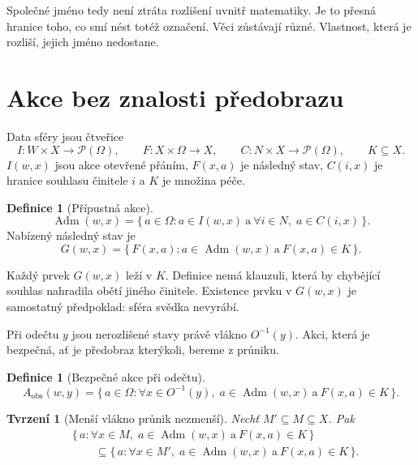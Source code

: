 \documentclass[11pt,a4paper]{article}
\newtheorem{proposition}[theorem]{Tvrzení}
\theoremstyle{definition}
\newtheorem{definition}[theorem]{Definice}
\theoremstyle{remark}
\newcommand{\Adm}{\operatorname{Adm}}
\newcommand{\Aobs}{A_{\mathrm{obs}}}
\begin{document}
Společné jméno tedy není ztráta rozlišení uvnitř matematiky.
Je to přesná hranice toho, co smí nést totéž označení.
Věci zůstávají různé. Vlastnost, která je rozliší, jejich jméno nedostane.

\section{Akce bez znalosti předobrazu}

Data sféry jsou čtveřice
\[
  I\colon W\times X\to \mathcal{P}(\Omega),\qquad
  F\colon X\times\Omega\to X,\qquad
  C\colon N\times X\to \mathcal{P}(\Omega),\qquad
  K\subseteq X.
\]
\(I(w,x)\) jsou akce otevřené přáním, \(F(x,a)\) je následný stav,
\(C(i,x)\) je hranice souhlasu činitele \(i\) a \(K\) je množina péče.

\begin{definition}[Přípustná akce]
\[
  \Adm(w,x)
  =
  \bigl\{\,a\in\Omega :
    a\in I(w,x)
    \ \text{a}\ 
    \forall i\in N,\; a\in C(i,x)
  \,\bigr\}.
\]
Nabízený následný stav je
\[
  G(w,x)
  =
  \bigl\{\,F(x,a):
    a\in\Adm(w,x)
    \ \text{a}\ 
    F(x,a)\in K
  \,\bigr\}.
\]
\end{definition}

Každý prvek \(G(w,x)\) leží v \(K\).
Definice nemá klauzuli, která by chybějící souhlas nahradila obětí jiného činitele.
Existence prvku v \(G(w,x)\) je samostatný předpoklad: sféra svědka nevyrábí.

Při odečtu \(y\) jsou nerozlišené stavy právě vlákno \(O^{-1}(y)\).
Akci, která je bezpečná, ať je předobraz kterýkoli, bereme z průniku.

\begin{definition}[Bezpečné akce při odečtu]
\label{def:aobs}
\[
  \Aobs(w,y)
  =
  \bigl\{\,a\in\Omega :
    \forall x\in O^{-1}(y),\;
    a\in\Adm(w,x)
    \ \text{a}\ 
    F(x,a)\in K
  \,\bigr\}.
\]
\end{definition}

\begin{proposition}[Menší vlákno průnik nezmenší]
\label{prop:mono}
Nechť \(M'\subseteq M\subseteq X\). Pak
\begin{align*}
  &\bigl\{\,a :
    \forall x\in M,\;
    a\in\Adm(w,x)\ \text{a}\ F(x,a)\in K
  \,\bigr\}\\
  &\qquad\subseteq
  \bigl\{\,a :
    \forall x\in M',\;
    a\in\Adm(w,x)\ \text{a}\ F(x,a)\in K
  \,\bigr\}.
\end{align*}
\end{proposition}
\end{document}
